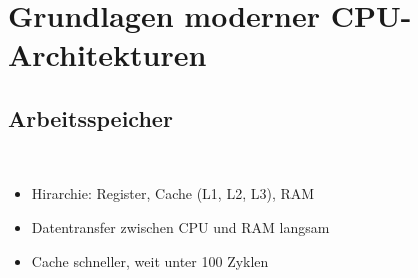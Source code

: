\documentclass[aspectratio=1210]{beamer}
\begin{document}
\section{Grundlagen moderner CPU-Architekturen}
\subsection{Arbeitsspeicher}
\begin{frame}{\insertsection\\\insertsubsection}
	\begin{itemize}
		\item Hirarchie: Register, Cache (L1, L2, L3), RAM
		\item Datentransfer zwischen CPU und RAM langsam
		\item Cache schneller, weit unter 100 Zyklen
	\end{itemize}
\end{frame}
\end{document}
